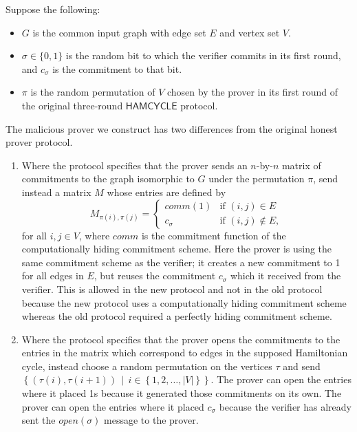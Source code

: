 \documentclass{article}
\newcommand{\lang}[1]{{\ensuremath{\mathsf{#1}}}}
\begin{document}
\begin{enumerate}
  Suppose the following:
  \begin{itemize}
  \item $G$ is the common input graph with edge set $E$ and vertex set $V$.
  \item $\sigma\in\{0,1\}$ is the random bit to which the verifier commits in its first round, and $c_\sigma$ is the commitment to that bit.
  \item $\pi$ is the random permutation of $V$ chosen by the prover in its first round of the original three-round \lang{HAMCYCLE} protocol.
  \end{itemize}
  The malicious prover we construct has two differences from the original honest prover protocol.
  \begin{enumerate}
  \item Where the protocol specifies that the prover sends an $n$-by-$n$ matrix of commitments to the graph isomorphic to $G$ under the permutation $\pi$, send instead a matrix $M$ whose entries are defined by
    \begin{displaymath}
      M_{\pi(i),\pi(j)} =
      \begin{cases}
        comm(1) & \text{if } (i, j)\in E \\
        c_\sigma & \text{if } (i, j)\notin E,
      \end{cases}
    \end{displaymath}
    for all $i, j\in V$, where $comm$ is the commitment function of the computationally hiding commitment scheme.
    Here the prover is using the same commitment scheme as the verifier; it creates a new commitment to 1 for all edges in $E$, but reuses the commitment $c_\sigma$ which it received from the verifier.
    This is allowed in the new protocol and not in the old protocol because the new protocol uses a computationally hiding commitment scheme whereas the old protocol required a perfectly hiding commitment scheme.
  \item
    Where the protocol specifies that the prover opens the commitments to the entries in the matrix which correspond to edges in the supposed Hamiltonian cycle, instead choose a random permutation on the vertices $\tau$ and send $\left\{\left(\tau(i),\tau(i+1)\right)\,\middle|\,i\in\left\{1,2,\ldots,|V|\right\}\right\}$.
    The prover can open the entries where it placed 1s because it generated those commitments on its own.
    The prover can open the entries where it placed $c_\sigma$ because the verifier has already sent the $open(\sigma)$ message to the prover.
  \end{enumerate}


\end{enumerate}
\end{document}
